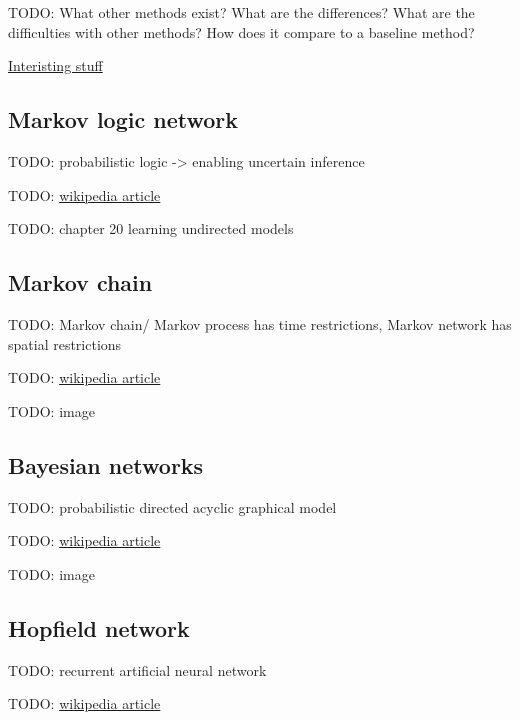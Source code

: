 TODO: What other methods exist? What are the differences? What are the difficulties with other methods? How does it compare to a baseline method?

\href{https://www.math.leidenuniv.nl/scripties/BSC-Obbens.pdf}{Interisting stuff} \cite{obbens2014inference}


\subsection{Markov logic network}

TODO: probabilistic logic -> enabling uncertain inference

TODO: \href{https://en.wikipedia.org/wiki/Markov_logic_network}{wikipedia article}

TODO: \cite{koller2009probabilistic} chapter 20 learning undirected models


\subsection{Markov chain}

TODO: Markov chain/ Markov process has time restrictions, Markov network has spatial restrictions

TODO: \href{https://en.wikipedia.org/wiki/Markov_chain}{wikipedia article}

TODO: image


\subsection{Bayesian networks}

TODO: probabilistic directed acyclic graphical model

TODO: \href{https://en.wikipedia.org/wiki/Bayesian_network}{wikipedia article}

TODO: image


\subsection{Hopfield network}

TODO: recurrent artificial neural network

TODO: \href{https://en.wikipedia.org/wiki/Hopfield_network}{wikipedia article}

